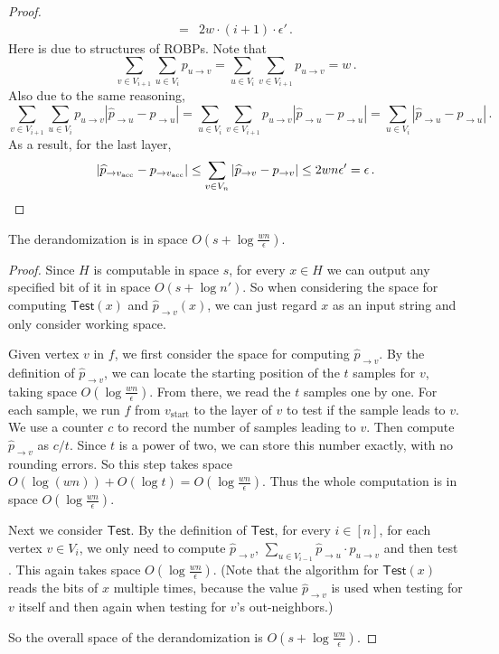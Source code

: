 \documentclass{toc}
\begin{document}
\begin{proof}
\begin{align}
={} & 2w \cdot (i + 1) \cdot \epsilon'\,. \nonumber
\end{align}
Here  is due to  structures of ROBPs. Note that 
$$\sum_{v\in V_{i+1}} \sum_{u\in V_i} p_{u \to v} =  \sum_{u\in V_i} \sum_{v\in V_{i+1}} p_{u \to v}  = w\,.$$ 
Also due to the same reasoning,
$$\sum_{v\in V_{i+1}} \sum_{u\in V_i} p_{u \to v}|\widehat{p}_{ \to u} - p_{ \to u}| = \sum_{u\in V_i} \sum_{v\in V_{i+1}} p_{u \to v} |\widehat{p}_{ \to u} - p_{ \to u}| = \sum_{u\in V_i} |\widehat{p}_{ \to u} -p_{ \to u}|\,.$$
As a result, for the last layer,
\[ |\widehat{p}_{\to v_{\text{acc}}} - p_{ \to v_{\text{acc}}}| \leq \sum_{v\in  V_{n }} |\widehat{p}_{\to v} - p_{ \to v}| \leq 2wn \epsilon' = \epsilon\,. \qedhere \]
\end{proof}


\begin{lemma} \label{lem:DrandIsInLogspace}
The derandomization is in space $O(s+\log \frac{wn}{\epsilon})$.
\end{lemma}

\begin{proof}
Since $H$ is computable in space $s$, for every $x\in H$ we can output any specified bit of it in space $O(s+\log n')$. So when considering the space for computing $ \mathsf{Test}(x)$ and $ \widehat{p}_{\to v}(x)$, we can just regard $x$ as an input string and only consider working space.

Given vertex $v$ in $f$, we first consider the space for computing $\widehat{p}_{\to v}$. By the definition of $\widehat{p}_{\to v}$, we can locate the starting position of the $t$ samples for $v$, taking space $O(\log \frac{wn}{\epsilon})$. From there, we read the $t$ samples one by one. For each sample, we run $f$ from $v_{\text{start}}$ to the layer of $v$ to test if the sample leads to $v$. We use a counter $c$ to record the number of samples leading to $v$. Then compute $\widehat{p}_{\to v}$ as $c/t$. Since $t$ is a power of two, we can store this number exactly, with no rounding errors. So this step takes space $O(\log (wn))+O(\log t) =  O(\log \frac{wn}{\epsilon})$. Thus the whole computation is in space $O(\log \frac{wn}{\epsilon})$.

Next we consider $\mathsf{Test}$. By the definition of $\mathsf{Test}$, for every $i\in [n]$, for each vertex $v \in V_i$, we only need to compute $\widehat{p}_{\to v}$, $ \sum_{u \in V_{i-1} } \widehat{p}_{\to u} \cdot p_{u \to v} $ and then test . This again takes space $O(\log \frac{wn}{\epsilon})$. (Note that the algorithm for $\mathsf{Test}(x)$ reads the bits of $x$ multiple times, because the value $\widehat{p}_{\to v}$ is used when testing  for $v$ itself and then again when testing  for $v$'s out-neighbors.)

So the overall space of the derandomization is $O(s+\log \frac{wn}{\epsilon})$.
\end{proof}
\end{document}
